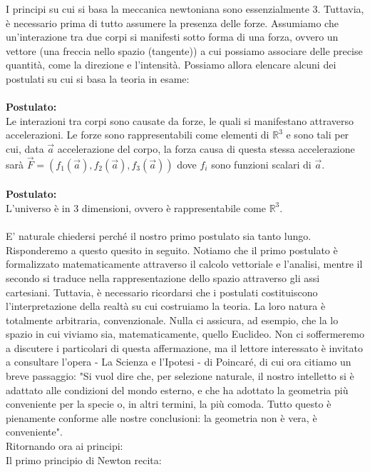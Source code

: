 \documentclass[]{article}
\begin{document}
	I principi su cui si basa la meccanica newtoniana sono essenzialmente 3. Tuttavia, è necessario prima di tutto assumere la presenza delle forze. Assumiamo che un'interazione tra due corpi si manifesti sotto forma di una forza, ovvero un vettore (una freccia nello spazio (tangente)) a cui possiamo associare delle precise quantità, come la direzione e l'intensità.		
	Possiamo allora elencare alcuni dei postulati su cui si basa la teoria in esame:
	\\\\
	\textbf{Postulato:}\\
	Le interazioni tra corpi sono causate da forze, le quali si manifestano attraverso accelerazioni. Le forze sono rappresentabili come elementi di $\mathbb{R}^3$ e sono tali per cui, data $\vec{a}$ accelerazione del corpo, la forza causa di questa stessa accelerazione sarà $\vec{F}=(f_1(\vec{a}),f_2(\vec{a}),f_3(\vec{a}))$ dove $f_i$ sono funzioni scalari di $\vec{a}$.
	\\\\
	\textbf{Postulato:}\\
	L'universo è in 3 dimensioni, ovvero è rappresentabile come $\mathbb{R}^3$.
	\\\\
	E' naturale chiedersi perché il nostro primo postulato sia tanto lungo. Risponderemo a questo quesito in seguito. Notiamo che il primo postulato è formalizzato matematicamente attraverso il calcolo vettoriale e l'analisi, mentre il secondo si traduce nella rappresentazione dello spazio attraverso gli assi cartesiani. Tuttavia, è necessario ricordarsi che i postulati costituiscono l'interpretazione della realtà su cui costruiamo la teoria. La loro natura è totalmente arbitraria, convenzionale. Nulla ci assicura, ad esempio, che la lo spazio in cui viviamo sia, matematicamente, quello Euclideo. Non ci soffermeremo a discutere i particolari di questa affermazione, ma il lettore interessato è invitato a consultare l'opera - La Scienza e l'Ipotesi - di Poincaré, di cui ora citiamo un breve passaggio: "Si vuol dire che, per selezione naturale, il nostro intelletto si è adattato alle condizioni del mondo esterno, e che ha adottato la geometria più conveniente per la specie o, in altri termini, la più comoda. Tutto questo è pienamente conforme alle nostre conclusioni: la geometria non è vera, è conveniente".\\
	Ritornando ora ai principi:\\
	Il primo principio di Newton recita: 
	\\\\
\end{document}

